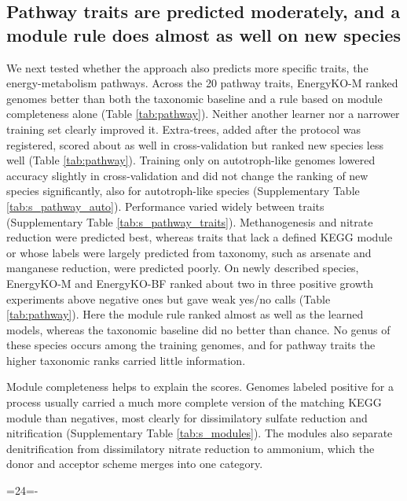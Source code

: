 \documentclass[10pt,a4paper,onecolumn]{article}
\begin{document}
\subsection{Pathway traits are predicted moderately, and a module rule
does almost as well on new
species}\label{pathway-traits-are-predicted-moderately-and-a-module-rule-does-almost-as-well-on-new-species}

We next tested whether the approach also predicts more specific traits,
the energy-metabolism pathways. Across the 20 pathway traits, EnergyKO-M
ranked genomes better than both the taxonomic baseline and a rule based
on module completeness alone (Table \ref{tab:pathway}). Neither another
learner nor a narrower training set clearly improved it. Extra-trees,
added after the protocol was registered, scored about as well in
cross-validation but ranked new species less well (Table
\ref{tab:pathway}). Training only on autotroph-like genomes lowered
accuracy slightly in cross-validation and did not change the ranking of
new species significantly, also for autotroph-like species
(Supplementary Table \ref{tab:s_pathway_auto}). Performance varied
widely between traits (Supplementary Table \ref{tab:s_pathway_traits}).
Methanogenesis and nitrate reduction were predicted best, whereas traits
that lack a defined KEGG module or whose labels were largely predicted
from taxonomy, such as arsenate and manganese reduction, were predicted
poorly. On newly described species, EnergyKO-M and EnergyKO-BF ranked
about two in three positive growth experiments above negative ones but
gave weak yes/no calls (Table \ref{tab:pathway}). Here the module rule
ranked almost as well as the learned models, whereas the taxonomic
baseline did no better than chance. No genus of these species occurs
among the training genomes, and for pathway traits the higher taxonomic
ranks carried little information.

Module completeness helps to explain the scores. Genomes labeled
positive for a process usually carried a much more complete version of
the matching KEGG module than negatives, most clearly for dissimilatory
sulfate reduction and nitrification (Supplementary Table
\ref{tab:s_modules}). The modules also separate denitrification from
dissimilatory nitrate reduction to ammonium, which the donor and
acceptor scheme merges into one category.

\par

\begingroup{}=24\baselineskip{}=\pagegoal\advance{}-\pagetotal\ifdim\dimen0>\dimen2\ifdim\dimen2>0pt\vfil\fi{}\fi\endgroup
\end{document}
